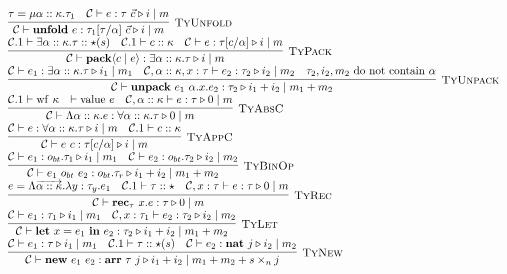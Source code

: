 \documentclass[fleqn]{article}
\begin{document}
\[\begin{array}{l}
	\infer[\textsc{TyUnfold}]{\mathcal{C} \vdash \mathbf{unfold}~e : \tau_1[\tau/\alpha]~\vec{c} \triangleright i \mid m}{\tau = \mu \alpha :: \kappa. \tau_1 & \mathcal{C} \vdash e : \tau~\vec{c} \triangleright i \mid m} \\
	\infer[\textsc{TyPack}]{\mathcal{C} \vdash \mathbf{pack}\langle c \mid e \rangle : \exists \alpha :: \kappa. \tau \triangleright i \mid m}{\mathcal{C}.1 \vdash \exists \alpha :: \kappa. \tau :: \star(s) & \mathcal{C}.1 \vdash c :: \kappa & \mathcal{C} \vdash e : \tau[c/\alpha] \triangleright i \mid m} \\
	\infer[\textsc{TyUnpack}]{\mathcal{C} \vdash \mathbf{unpack}~e_1~\alpha.x.e_2 : \tau_2 \triangleright i_1 + i_2 \mid m_1 + m_2}{\mathcal{C} \vdash e_1 : \exists \alpha :: \kappa. \tau \triangleright i_1 \mid m_1 & \mathcal{C},\alpha::\kappa,x:\tau \vdash e_2 : \tau_2 \triangleright i_2 \mid m_2 & \tau_2,i_2,m_2~\mathrm{do~not~contain}~\alpha} \\
	\infer[\textsc{TyAbsC}]{\mathcal{C} \vdash \Lambda \alpha :: \kappa. e : \forall \alpha :: \kappa. \tau \triangleright 0 \mid m}{\mathcal{C}.1 \vdash \mathrm{wf}~\kappa & \vdash \mathrm{value}~e & \mathcal{C},\alpha :: \kappa \vdash e : \tau \triangleright 0 \mid m} \\
	\infer[\textsc{TyAppC}]{\mathcal{C} \vdash e~c : \tau[c/\alpha] \triangleright i \mid m}{\mathcal{C} \vdash e : \forall \alpha :: \kappa. \tau \triangleright i \mid m & \mathcal{C}.1 \vdash c :: \kappa} \\
	\infer[\textsc{TyBinOp}]{\mathcal{C} \vdash e_1~o_{bt}~e_2 : o_{bt}.\tau_r \triangleright i_1 + i_2 \mid m_1 + m_2}{\mathcal{C} \vdash e_1 : o_{bt}.\tau_1 \triangleright i_1 \mid m_1 & \mathcal{C} \vdash e_2 : o_{bt}.\tau_2 \triangleright i_2 \mid m_2} \\
	\infer[\textsc{TyRec}]{\mathcal{C} \vdash \mathbf{rec}_\tau~x. e : \tau \triangleright 0 \mid m}{e = \Lambda \overrightarrow{\alpha :: \kappa}. \lambda y : \tau_y. e_1 & \mathcal{C}.1 \vdash \tau :: \star & \mathcal{C},x:\tau \vdash e : \tau \triangleright 0 \mid m} \\
	\infer[\textsc{TyLet}]{\mathcal{C} \vdash \mathbf{let}~x=e_1~\mathbf{in}~e_2 : \tau_2 \triangleright i_1 + i_2 \mid m_1 + m_2}{\mathcal{C} \vdash e_1 : \tau_1 \triangleright i_1 \mid m_1 & \mathcal{C},x:\tau_1 \vdash e_2 : \tau_2 \triangleright i_2 \mid m_2} \\
	\infer[\textsc{TyNew}]{\mathcal{C} \vdash \mathbf{new}~e_1~e_2 : \mathbf{arr}~\tau~j \triangleright i_1 + i_2 \mid m_1 + m_2 + s \times_n j}{\mathcal{C} \vdash e_1 : \tau \triangleright i_1 \mid m_1 & \mathcal{C}.1 \vdash \tau :: \star(s) & \mathcal{C} \vdash e_2 : \mathbf{nat}~j \triangleright i_2 \mid m_2} \\

\end{array}\]
\end{document}
